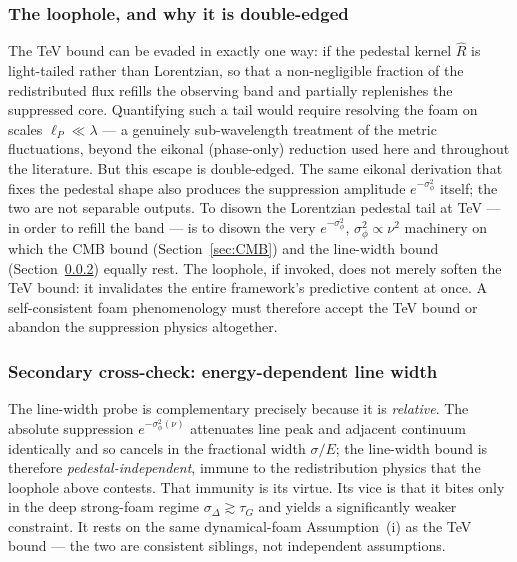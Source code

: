 \documentclass[aps,prd,onecolumn,amsmath,amssymb]{revtex4-2}
\begin{document}
\subsubsection{The loophole, and why it is double-edged}
\label{sec:grb_loophole}

The TeV bound can be evaded in exactly one way: if the pedestal kernel
$\hat{R}$ is light-tailed rather than Lorentzian, so that a
non-negligible fraction of the redistributed flux refills the observing
band and partially replenishes the suppressed core.  Quantifying such a
tail would require resolving the foam on scales $\ell_P\ll\lambda$ ---
a genuinely sub-wavelength treatment of the metric fluctuations, beyond
the eikonal (phase-only) reduction used here and throughout the
literature.  But this escape is double-edged.  The same eikonal
derivation that fixes the pedestal shape also produces the suppression
amplitude $e^{-\sigma_\phi^2}$ itself; the two are not separable outputs.
To disown the Lorentzian pedestal tail at TeV --- in order to refill the
band --- is to disown the very $e^{-\sigma_\phi^2}$, $\sigma_\phi^2\propto
\nu^2$ machinery on which the CMB bound (Section~\ref{sec:CMB}) and the
line-width bound (Section~\ref{sec:grb_width}) equally rest.  The
loophole, if invoked, does not merely soften the TeV bound: it
invalidates the entire framework's predictive content at once.  A
self-consistent foam phenomenology must therefore accept the TeV bound or
abandon the suppression physics altogether.

\subsubsection{Secondary cross-check: energy-dependent line width}
\label{sec:grb_width}

The line-width probe is complementary precisely because it is
\emph{relative}.  The absolute suppression $e^{-\sigma_\phi^2(\nu)}$
attenuates line peak and adjacent continuum identically and so cancels
in the fractional width $\sigma/E$; the line-width bound is therefore
\emph{pedestal-independent}, immune to the redistribution physics that
the loophole above contests.  That immunity is its virtue.  Its vice is
that it bites only in the deep strong-foam regime $\sigma_\Delta\gtrsim
\tau_G$ and yields a significantly weaker constraint.  It rests on the
same dynamical-foam Assumption~(i) as the TeV bound --- the two are
consistent siblings, not independent assumptions.
\end{document}
